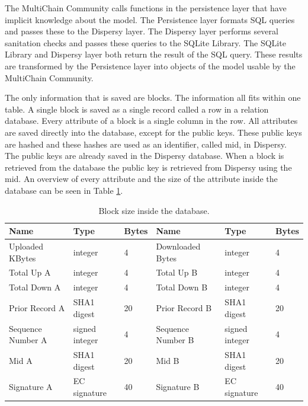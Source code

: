The MultiChain Community calls functions in the persistence layer that have implicit knowledge about the model.
The Persistence layer formats SQL queries and passes these to the Dispersy layer.
The Dispersy layer performs several sanitation checks and passes these queries to the SQLite Library.
The SQLite Library and Dispersy layer both return the result of the SQL query.
These results are transformed by the Persistence layer into objects of the model usable by the MultiChain Community.

The only information that is saved are blocks.
The information all fits within one table.
A single block is saved as a single record called a row in a relation database.
Every attribute of a block is a single column in the row.
All attributes are saved directly into the database,
except for the public keys.
These public keys are hashed and these hashes are used as an identifier, called mid, in Dispersy.
The public keys are already saved in the Dispersy database.
When a block is retrieved from the database the public key is retrieved from Dispersy using the mid.
An overview of every attribute and the size of the attribute inside the database can be seen in Table \ref{table:block_size_persistence}.

\begin{table}[]
\begin{adjustwidth}{-.5in}{-.5in}
\begin{center}
\begin{tabular}{lll||lll}
Name              & Type             & Bytes                   & Name              & Type             & Bytes \\ \hline
Uploaded KBytes   & integer          & 4                      & Downloaded Bytes  & integer          & 4     \\
Total Up A        & integer          & 4                      & Total Up B        & integer          & 4     \\
Total Down A      & integer          & 4                      & Total Down B      & integer          & 4     \\
Prior Record A    & SHA1 digest      & 20                     & Prior Record B    & SHA1 digest      & 20    \\
Sequence Number A & signed integer   & 4                      & Sequence Number B & signed integer   & 4     \\
Mid A             & SHA1 digest      & 20                     & Mid B             & SHA1 digest      & 20    \\
Signature A       & EC signature     & 40                     & Signature B       & EC signature     & 40
\end{tabular}
\caption{Block size inside the database.}
\label{table:block_size_persistence}
\end{center}
\end{adjustwidth}
\end{table}

